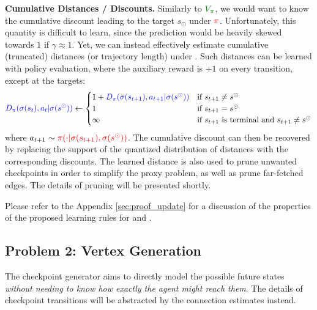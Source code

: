 \textbf{Cumulative Distances / Discounts.} 
Similarly to $\darkgreen{V_\pi}$, we would want to know the cumulative discount leading to the target $s_\odot$ under $\textcolor{red}{\pi}$. Unfortunately, this quantity is difficult to learn, since the prediction would be heavily skewed towards $1$ if $\gamma \approx 1$. Yet, we can instead effectively estimate cumulative (truncated) distances (or trajectory length) under \red{$\pi$}. Such distances can be learned with policy evaluation, where the auxiliary reward is $+1$ on every transition, except at the targets:
\vspace*{-1mm}
\begin{equation*}
\blue{D_\pi(\sigma(s_t), a_t | \sigma(s^{\odot}))} \gets \begin{cases}
1 + \blue{D_\pi(\sigma(s_{t+1}), a_{t+1} | \sigma(s^{\odot}))} &\text{if } s_{t+1} \neq s^{\odot}\\
1 &\text{if } s_{t+1} = s^{\odot}\\
\infty &\text{if } s_{t+1} \text{ is terminal and } s_{t+1} \neq s^{\odot}\\
\end{cases}
\vspace*{-1mm}
\end{equation*}
where $a_{t+1} \sim \textcolor{red}{\pi(\cdot | \sigma(s_{t+1}), \sigma(s^{\odot}))}$. The cumulative discount can then be recovered by replacing the support of the quantized distribution of distances with the corresponding discounts. The learned distance is also used to prune unwanted checkpoints in order to simplify the proxy problem, as well as prune far-fetched edges. The details of pruning will be presented shortly.

Please refer to the Appendix \ref{sec:proof_update} for a discussion of the properties of the proposed learning rules for  and \blue{$\hat{\gamma}_\pi$}. 

\subsection{Problem 2: Vertex Generation}

The checkpoint generator aims to directly model the possible future states \textit{without needing to know how exactly the agent might reach them}. The details of checkpoint transitions will be abstracted by the connection estimates instead. 

